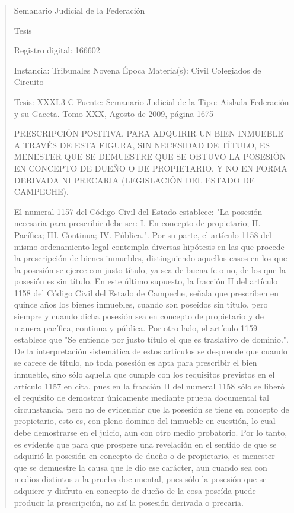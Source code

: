 \documentclass[11pt,a4paper]{article}
\begin{document}
\begin{quote}
                                                   Semanario Judicial de la Federación

                                                  Tesis

 Registro digital: 166602

 Instancia: Tribunales             Novena Época                           Materia(s): Civil
 Colegiados de Circuito

 Tesis: XXXI.3 C                   Fuente: Semanario Judicial de la Tipo: Aislada
                                   Federación y su Gaceta.
                                   Tomo XXX, Agosto de 2009, página
                                   1675


PRESCRIPCIÓN POSITIVA. PARA ADQUIRIR UN BIEN INMUEBLE A TRAVÉS DE ESTA
FIGURA, SIN NECESIDAD DE TÍTULO, ES MENESTER QUE SE DEMUESTRE QUE SE OBTUVO
LA POSESIÓN EN CONCEPTO DE DUEÑO O DE PROPIETARIO, Y NO EN FORMA DERIVADA
NI PRECARIA (LEGISLACIÓN DEL ESTADO DE CAMPECHE).


El numeral 1157 del Código Civil del Estado establece: "La posesión necesaria para prescribir debe
ser: I. En concepto de propietario; II. Pacífica; III. Continua; IV. Pública.". Por su parte, el artículo
1158 del mismo ordenamiento legal contempla diversas hipótesis en las que procede la prescripción
de bienes inmuebles, distinguiendo aquellos casos en los que la posesión se ejerce con justo título,
ya sea de buena fe o no, de los que la posesión es sin título. En este último supuesto, la fracción II
del artículo 1158 del Código Civil del Estado de Campeche, señala que prescriben en quince años
los bienes inmuebles, cuando son poseídos sin título, pero siempre y cuando dicha posesión sea en
concepto de propietario y de manera pacífica, continua y pública. Por otro lado, el artículo 1159
establece que "Se entiende por justo título el que es traslativo de dominio.". De la interpretación
sistemática de estos artículos se desprende que cuando se carece de título, no toda posesión es
apta para prescribir el bien inmueble, sino sólo aquella que cumple con los requisitos previstos en el
artículo 1157 en cita, pues en la fracción II del numeral 1158 sólo se liberó el requisito de demostrar
únicamente mediante prueba documental tal circunstancia, pero no de evidenciar que la posesión
se tiene en concepto de propietario, esto es, con pleno dominio del inmueble en cuestión, lo cual
debe demostrarse en el juicio, aun con otro medio probatorio. Por lo tanto, es evidente que para que
prospere una revelación en el sentido de que se adquirió la posesión en concepto de dueño o de
propietario, es menester que se demuestre la causa que le dio ese carácter, aun cuando sea con
medios distintos a la prueba documental, pues sólo la posesión que se adquiere y disfruta en
concepto de dueño de la cosa poseída puede producir la prescripción, no así la posesión derivada o
precaria.


\end{quote}
\end{document}
